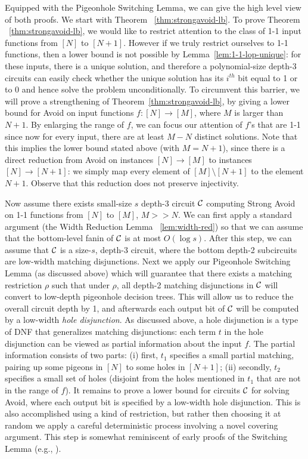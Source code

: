 Equipped with the Pigeonhole Switching Lemma, we can give the high level view of both proofs. 
We start with Theorem ~\ref{thm:strongavoid-lb}.
To prove Theorem ~\ref{thm:strongavoid-lb}, we would like to restrict  attention to the class of 1-1 input functions from $[N]$ to $[N+1]$. However if we truly restrict ourselves to 1-1 functions,
then a lower bound is not possible by Lemma~\ref{lem:1-1-lop-unique}: for these inputs, there is a unique solution, and therefore a polynomial-size depth-3 circuits can easily check whether the unique solution has its $i^{th}$ bit equal to 1 or to 0 and hence solve the problem unconditionally.
To circumvent this barrier, we will prove a strengthening of Theorem~\ref{thm:strongavoid-lb}, by giving a lower bound for Avoid on input functions $f: [N] \rightarrow [M]$, where $M$ is larger than $N+1$. By enlarging the range of $f$, we can focus our attention of $f$'s that are 1-1 since now for every input, there are at least $M-N$ distinct solutions.
Note that this implies the lower bound stated above (with $M=N+1$), since there is a direct reduction from Avoid on instances $[N] \to [M]$ to instances $[N] \to [N+1]$: we simply map every element of $[M] \setminus [N+1]$ to the element $N+1$. Observe that this reduction does not preserve injectivity.

Now assume there exists small-size $s$ depth-3 circuit ${\cal C}$ computing Strong Avoid on 1-1 functions from $[N]$ to $[M]$, $M>>N$. 
We can first apply a standard argument (the Width Reduction Lemma ~\ref{lem:width-red}) so that we can assume that the bottom-level fanin of ${\cal C}$ is at most $O(\log s)$. After this step, we can assume that ${\cal C}$ is a size-$s$, depth-3 circuit, where the bottom depth-2 subcircuits are low-width matching disjunctions. 
Next we apply our Pigeonhole Switching Lemma (as discussed above) which will guarantee that there exists a matching restriction $\rho$ such that under $\rho$, all depth-2 matching disjunctions in ${\cal C}$ will convert to low-depth pigeonhole decision trees. This will allow us to reduce the overall circuit depth by 1, and afterwards each output bit of ${\cal C}$ will be computed by a low-width \emph{hole disjunction}.
As discussed above, a hole disjunction is a type of DNF that generalizes matching disjunctions: each term $t$ in the hole disjunction can be viewed as partial information about the input $f$. The partial information consists of two parts: (i) first, $t_1$ specifies a small partial matching, pairing up some pigeons in $[N]$ to some holes in $[N+1]$; (ii) secondly, $t_2$ specifies a small set of holes (disjoint from the holes mentioned in $t_1$ that are not in the range of $f$).
It remains to prove a lower bound for circuits ${\cal C}$ for solving Avoid, where each output bit is specified by a low-width hole disjunction. This is also accomplished using a kind of restriction, but rather then choosing it at random we apply a careful deterministic process involving a novel covering argument. This step is somewhat reminiscent of early proofs of the Switching Lemma (e.g., \cite{FSS,Ajtai83}).



